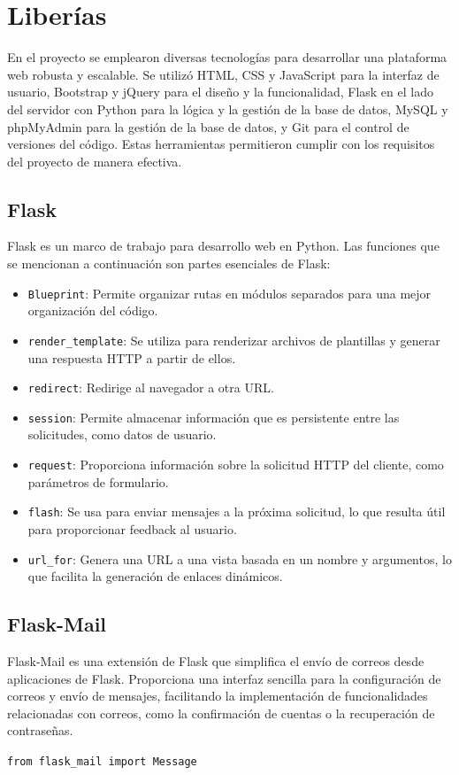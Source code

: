 \documentclass[a4paper, 12pt]{book}
\begin{document}
\section{Liberías}
\label{sec:Librerias}

En el proyecto se emplearon diversas tecnologías para desarrollar una plataforma web robusta y escalable. Se utilizó HTML, CSS y JavaScript para la interfaz de usuario, Bootstrap y jQuery para el diseño y la funcionalidad, Flask en el lado del servidor con Python para la lógica y la gestión de la base de datos, MySQL y phpMyAdmin para la gestión de la base de datos, y Git para el control de versiones del código. Estas herramientas permitieron cumplir con los requisitos del proyecto de manera efectiva.
\subsection{Flask} 
Flask \cite{flaskbook} es un marco de trabajo para desarrollo web en Python. Las funciones que se mencionan a continuación son partes esenciales de Flask:

\begin{itemize}
  \item \texttt{Blueprint}: Permite organizar rutas en módulos separados para una mejor organización del código.
  \item \texttt{render\_template}: Se utiliza para renderizar archivos de plantillas y generar una respuesta HTTP a partir de ellos.
  \item \texttt{redirect}: Redirige al navegador a otra URL.
  \item \texttt{session}: Permite almacenar información que es persistente entre las solicitudes, como datos de usuario.
  \item \texttt{request}: Proporciona información sobre la solicitud HTTP del cliente, como parámetros de formulario.
  \item \texttt{flash}: Se usa para enviar mensajes a la próxima solicitud, lo que resulta útil para proporcionar feedback al usuario.
  \item \texttt{url\_for}: Genera una URL a una vista basada en un nombre y argumentos, lo que facilita la generación de enlaces dinámicos.
\end{itemize}

\subsection{Flask-Mail}
\label{subsec:flaskmail} 
Flask-Mail es una extensión de Flask que simplifica el envío de correos desde aplicaciones de Flask. Proporciona una interfaz sencilla 
para la configuración de correos y envío de mensajes, facilitando la implementación de funcionalidades relacionadas con correos, como la confirmación de cuentas 
o la recuperación de contraseñas.
\begin{center}
  \texttt{from flask\_mail import Message}
\end{center}
\end{document}
